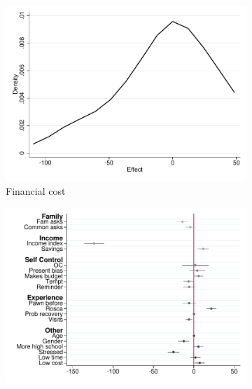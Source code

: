\documentclass[11pt]{article}
\begin{document}
\begin{figure}[H]
    \caption{Heterogeneous Treatment Effect - Choice/Promise}
    \label{heterogeneous_te_5}
    \begin{center}
    \begin{subfigure}{0.4\textwidth}
        \caption{Financial cost}
        \centering
        \includegraphics[width=\textwidth]{Figuras/he_dist_fc_admin_disc_pro_5.pdf}
    \end{subfigure}
    \begin{subfigure}{0.4\textwidth}
        \caption*{}
        \centering
        \includegraphics[width=\textwidth]{Figuras/HE/he_int_vertical_fc_admin_disc_pro_5.pdf}
    \end{subfigure}
    \begin{subfigure}{0.4\textwidth}

\end{subfigure}
\end{center}
\end{figure}
\end{document}

